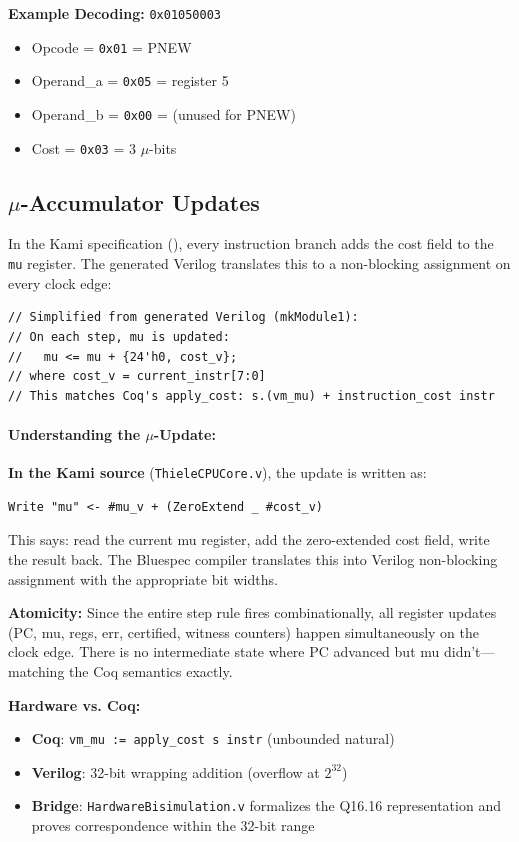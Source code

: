 \textbf{Example Decoding:} \texttt{0x01050003}
\begin{itemize}
    \item Opcode = \texttt{0x01} = PNEW
    \item Operand\_a = \texttt{0x05} = register 5
    \item Operand\_b = \texttt{0x00} = (unused for PNEW)
    \item Cost = \texttt{0x03} = 3 $\mu$-bits
\end{itemize}

\subsection{$\mu$-Accumulator Updates}

In the Kami specification (), every instruction branch adds the cost field to the \texttt{mu} register. The generated Verilog translates this to a non-blocking assignment on every clock edge:
\begin{lstlisting}
// Simplified from generated Verilog (mkModule1):
// On each step, mu is updated:
//   mu <= mu + {24'h0, cost_v};
// where cost_v = current_instr[7:0]
// This matches Coq's apply_cost: s.(vm_mu) + instruction_cost instr
\end{lstlisting}

\paragraph{Understanding the $\mu$-Update:}
\textbf{In the Kami source} (\texttt{ThieleCPUCore.v}), the update is written as:
\begin{verbatim}
Write "mu" <- #mu_v + (ZeroExtend _ #cost_v)
\end{verbatim}
This says: read the current mu register, add the zero-extended cost field, write the result back. The Bluespec compiler translates this into Verilog non-blocking assignment with the appropriate bit widths.

\textbf{Atomicity:} Since the entire step rule fires combinationally, all register updates (PC, mu, regs, err, certified, witness counters) happen simultaneously on the clock edge. There is no intermediate state where PC advanced but mu didn't---matching the Coq semantics exactly.

\textbf{Hardware vs. Coq:}
\begin{itemize}
    \item \textbf{Coq}: \texttt{vm\_mu := apply\_cost s instr} (unbounded natural)
    \item \textbf{Verilog}: 32-bit wrapping addition (overflow at $2^{32}$)
    \item \textbf{Bridge}: \texttt{HardwareBisimulation.v} formalizes the Q16.16 representation and proves correspondence within the 32-bit range
\end{itemize}

